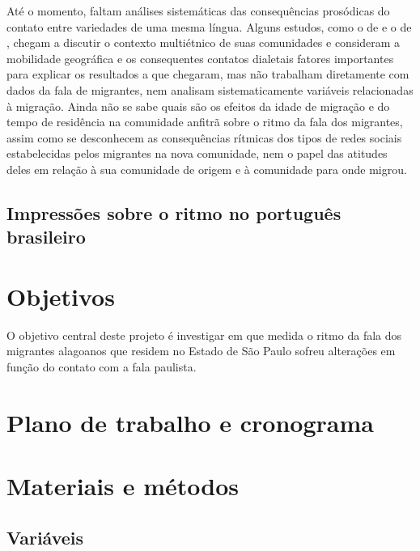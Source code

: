 \documentclass[
	a4paper,	%
	12pt,		%
	]{article}	%
\begin{document}
	Até o momento, faltam análises sistemáticas das consequências prosódicas do contato entre
	variedades de uma mesma língua. Alguns estudos, como o de \citet{Torgersen.Szakay2012} e o de
	\citet{Fagyal2010}, chegam a discutir o contexto multiétnico de suas comunidades e consideram a
	mobilidade geográfica e os consequentes contatos dialetais fatores importantes para explicar os
	resultados a que chegaram, mas não trabalham diretamente com dados da fala de migrantes, nem
	analisam sistematicamente variáveis relacionadas à migração.  Ainda não se sabe quais são os
	efeitos da idade de migração e do tempo de residência na comunidade anfitrã sobre o ritmo da
	fala dos migrantes, assim como se desconhecem as consequências rítmicas dos tipos de redes
	sociais estabelecidas pelos migrantes na nova comunidade, nem o papel das atitudes deles em
	relação à sua comunidade de origem e à comunidade para onde migrou.

	\subsection{Impressões sobre o ritmo no português brasileiro}

\section{Objetivos} \label{objetivos}

O objetivo central deste projeto é investigar em que medida o ritmo da fala dos migrantes alagoanos
que residem no Estado de São Paulo sofreu alterações em função do contato com a fala paulista.

\section{Plano de trabalho e cronograma} \label{plano}
	
\section{Materiais e métodos} 
\label{metodo}

	\subsection{Variáveis} \label{variaveis}
\end{document}
